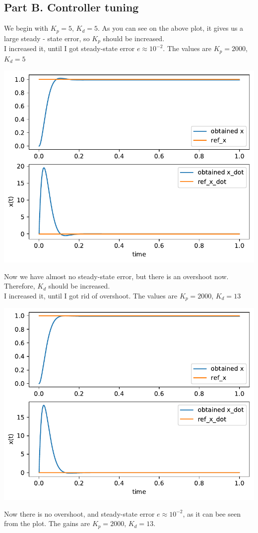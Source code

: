 \documentclass[a4paper,12pt]{article}
\begin{document}
    \subsection*{Part B. Controller tuning}
        We begin with $K_p = 5$, $K_d = 5$. As you can see on the above plot, 
        it gives us a large steady - state error, so $K_p$ should be increased.\\ 
        I increased it, 
        until I got steady-state error $e \approx 10^{-2}$. The values are 
        $K_p = 2000$, $K_d = 5$
        \begin{center}
            \includegraphics[width = 0.72\linewidth]{2b_1.pdf}
        \end{center}
        Now we have almost no steady-state error, but there is an overshoot now.
        Therefore, $K_d$ should be increased.\\
        I increased it, until I got rid of overshoot. The values are 
        $K_p = 2000$, $K_d = 13$
        \begin{center}
            \includegraphics[width = 0.77\linewidth]{2b_2.pdf}
        \end{center}
        Now there is no overshoot, and steady-state error $e \approx 10^{-2}$, 
        as it can bee seen from the plot. The gains are $K_p = 2000$, $K_d = 13$.
\end{document}
